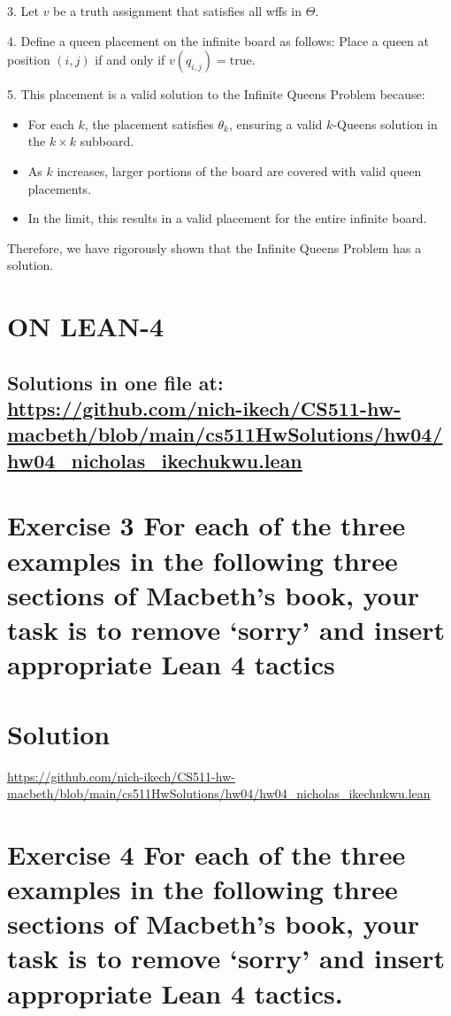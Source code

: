 \documentclass{article}
\begin{document}
3. Let $v$ be a truth assignment that satisfies all wffs in $\Theta$.

4. Define a queen placement on the infinite board as follows:
   Place a queen at position $(i,j)$ if and only if $v(q_{i,j}) = \text{true}$.

5. This placement is a valid solution to the Infinite Queens Problem because:
   \begin{itemize}
     \item For each $k$, the placement satisfies $\theta_k$, ensuring a valid $k$-Queens solution in the $k \times k$ subboard.
     \item As $k$ increases, larger portions of the board are covered with valid queen placements.
     \item In the limit, this results in a valid placement for the entire infinite board.
   \end{itemize}

Therefore, we have rigorously shown that the Infinite Queens Problem has a solution.

\newpage







\section*{ON LEAN-4}
\subsection*{Solutions in one file at: 
\url{https://github.com/nich-ikech/CS511-hw-macbeth/blob/main/cs511HwSolutions/hw04/hw04_nicholas_ikechukwu.lean}}

\newpage

\section*{Exercise 3 For each of the three examples in the following three sections of Macbeth’s book, your
task is to remove ‘sorry’ and insert appropriate Lean 4 tactics}
\section*{Solution}
\url{https://github.com/nich-ikech/CS511-hw-macbeth/blob/main/cs511HwSolutions/hw04/hw04_nicholas_ikechukwu.lean}

\newpage

\section*{Exercise 4 For each of the three examples in the following three sections of Macbeth’s book, your
task is to remove ‘sorry’ and insert appropriate Lean 4 tactics.}
\end{document}

